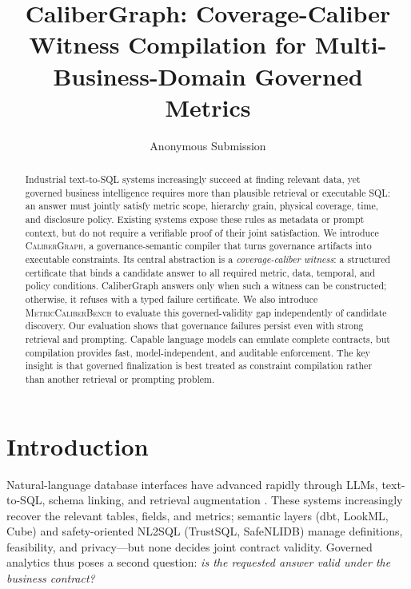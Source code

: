 \documentclass[letterpaper]{article}
\title{CaliberGraph: Coverage-Caliber Witness Compilation for Multi-Business-Domain Governed Metrics}
\author{Anonymous Submission}
\begin{document}
\maketitle

\begin{abstract}
Industrial text-to-SQL systems increasingly succeed at finding relevant data, yet governed business intelligence requires more than plausible retrieval or executable SQL: an answer must jointly satisfy metric scope, hierarchy grain, physical coverage, time, and disclosure policy. Existing systems expose these rules as metadata or prompt context, but do not require a verifiable proof of their joint satisfaction.
We introduce \textsc{CaliberGraph}, a governance-semantic compiler that turns governance artifacts into executable constraints. Its central abstraction is a \emph{coverage-caliber witness}: a structured certificate that binds a candidate answer to all required metric, data, temporal, and policy conditions. CaliberGraph answers only when such a witness can be constructed; otherwise, it refuses with a typed failure certificate. We also introduce \textsc{MetricCaliberBench} to evaluate this governed-validity gap independently of candidate discovery.
Our evaluation shows that governance failures persist even with strong retrieval and prompting. Capable language models can emulate complete contracts, but compilation provides fast, model-independent, and auditable enforcement. The key insight is that governed finalization is best treated as constraint compilation rather than another retrieval or prompting problem.
\end{abstract}

\begin{links}
\end{links}

\section{Introduction}

Natural-language database interfaces have advanced rapidly through LLMs, text-to-SQL, schema linking, and retrieval augmentation \citep{spider,bird,spider2,autolink2026}. These systems increasingly recover the relevant tables, fields, and metrics; semantic layers (dbt, LookML, Cube) and safety-oriented NL2SQL (TrustSQL, SafeNLIDB) manage definitions, feasibility, and privacy---but none decides joint contract validity. Governed analytics thus poses a second question: \emph{is the requested answer valid under the business contract?}
\end{document}
